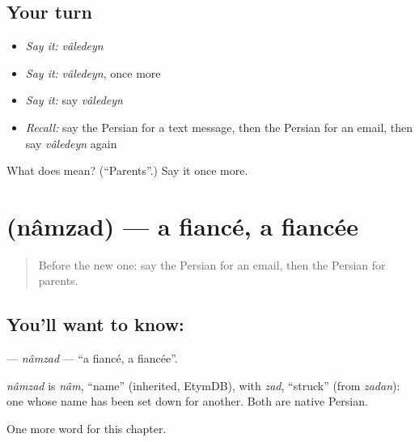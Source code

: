 \subsection*{Your turn}
\begin{itemize}
\raggedright
  \item \emph{Say it:} \emph{vâledeyn}
  \item \emph{Say it:} \emph{vâledeyn}, once more
  \item \emph{Say it:} say \emph{vâledeyn}
  \item \emph{Recall:} say the Persian for a text message, then the Persian for an email, then say \emph{vâledeyn} again
\end{itemize}

\begin{tcolorbox}[breakable,colback=teal!4,colframe=teal!35!black,title={Before you move on}]
What does  mean? (\textquotedblleft{}Parents\textquotedblright{}.) Say it once more.
\end{tcolorbox}
\section[\texorpdfstring{\fa{نامزد} (nâmzad)}{نامزد (nâmzad)}]{ (nâmzad) — a fiancé, a fiancée}

\label{lesson:FA-C277-namzad}



\begin{quote}
Before the new one: say the Persian for an email, then the Persian for parents.
\end{quote}

\subsection*{You'll want to know: }
\textbf{} — \emph{nâmzad} — \textquotedblleft{}a fiancé, a fiancée\textquotedblright{}.

\begin{cousinweb}
\emph{nâmzad} is \emph{nâm}, \textquotedblleft{}name\textquotedblright{} (inherited, EtymDB), with \emph{zad}, \textquotedblleft{}struck\textquotedblright{} (from \emph{zadan}): one whose name has been set down for another. Both are native Persian.
\end{cousinweb}

\begin{grammarlens}[title={What you've built}]
One more word for this chapter.
\end{grammarlens}

